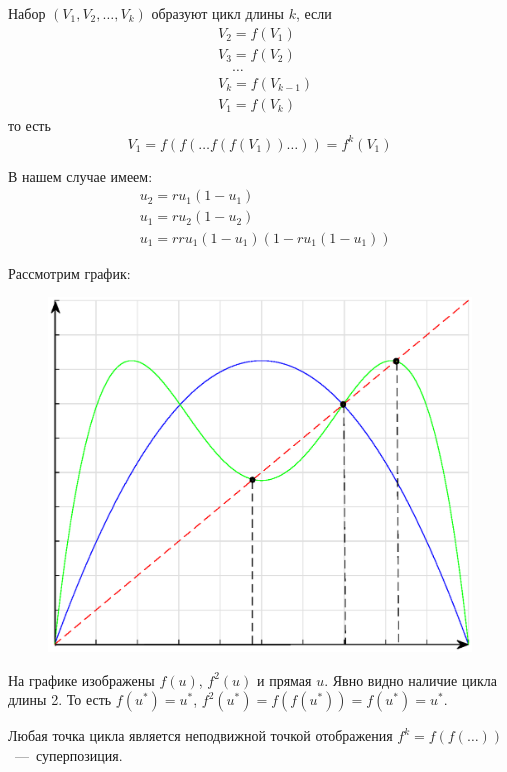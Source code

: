 \begin{definition}
Набор $(V_1, V_2, \ldots, V_k)$ образуют цикл длины $k$, если 
\begin{equation*}
\begin{aligned}
&V_2 = f(V_1)\\
&V_3 = f(V_2)\\
&\quad \ldots\\
&V_k = f(V_{k-1})\\
&V_1 = f(V_{k})
\end{aligned}
\end{equation*}
то есть
\begin{equation*}
V_1 = f(f(\ldots f(f(V_1))\ldots)) = f^k(V_1)
\end{equation*}
\end{definition}

В нашем случае имеем:
\begin{equation*}
\begin{aligned}
&u_2 =ru_1(1 - u_1)\\
&u_1 =ru_2(1 - u_2)\\
&u_1 = rru_1(1 - u_1)(1 - r u_1 (1 - u_1))
\end{aligned}
\end{equation*}

Рассмотрим график:\\
\begin{figure}[H]
\begin{center}
\includegraphics[width=0.5\linewidth]{ch1/ch1_fig7.eps}
\label{ch1.fig7}
\end{center}
\end{figure}
На графике изображены $f(u)$, $f^2(u)$ и прямая $u$. Явно видно наличие цикла длины 2. То есть $f(u^*) = u^*$, $f^2(u^*) = f(f(u^*)) = f(u^*) = u^*$.

\begin{assertion}
Любая точка цикла является неподвижной точкой отображения $f^k = f(f(\ldots ))$~---~суперпозиция.
\end{assertion}

